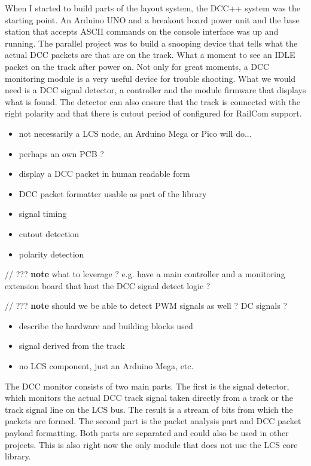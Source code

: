 
When I started to build parts of the layout system, the DCC++ system was the starting point. An Arduino UNO and a breakout board power unit and the base station that accepts ASCII commands on the console interface was up and running. The parallel project was to build a snooping device that tells what the actual DCC packets are that are on the track. What a moment to see an IDLE packet on the track after power on. Not only for great moments, a DCC monitoring module is a very useful device for trouble shooting. What we would need is a DCC signal detector, a controller and the module firmware that displays what is found. The detector can also ensure that the track is connected with the right polarity and that there is cutout period of configured for RailCom support.


\begin{itemize}
\item not necessarily a LCS node, an Arduino Mega or Pico will do...
\item perhaps an own PCB ?
\item display a DCC packet in human readable form
\item DCC packet formatter usable as part of the library
\item signal timing
\item cutout detection
\item polarity detection
\end{itemize}

// ??? \textbf{note} what to leverage ? e.g. have a main controller and a monitoring extension board that hast the DCC signal detect logic ?

// ??? \textbf{note} should we be able to detect PWM signals as well ? DC signals ?



\begin{itemize}
\item describe the hardware and building blocks used
\item signal derived from the track
\item no LCS component, just an Arduino Mega, etc.
\end{itemize}



The DCC monitor consists of two main parts. The first is the signal detector, which monitors the actual DCC track signal taken directly from a track or the track signal line on the LCS bus. The result is a stream of bits from which the packets are formed. The second part is the packet analysis part and DCC packet payload formatting. Both parts are separated and could also be used in other projects. This is also right now the only module that does not use the LCS core library.

